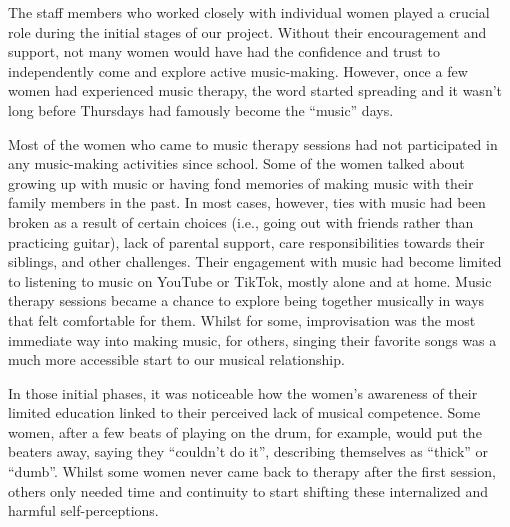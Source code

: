\documentclass[authordate, empirical]{jote-new-article}
\begin{document}
	The staff members who worked closely with individual women played a crucial role during the initial stages of our project. Without their encouragement and support, not many women would have had the confidence and trust to independently come and explore active music-making. However, once a few women had experienced music therapy, the word started spreading and it wasn't long before Thursdays had famously become the “music” days.







	Most of the women who came to music therapy sessions had not participated in any music-making activities since school. Some of the women talked about growing up with music or having fond memories of making music with their family members in the past. In most cases, however, ties with music had been broken as a result of certain choices (i.e., going out with friends rather than practicing guitar), lack of parental support, care responsibilities towards their siblings, and other challenges. Their engagement with music had become limited to listening to music on YouTube or TikTok, mostly alone and at home. Music therapy sessions became a chance to explore being together musically in ways that felt comfortable for them. Whilst for some, improvisation was the most immediate way into making music, for others, singing their favorite songs was a much more accessible start to our musical relationship.







	In those initial phases, it was noticeable how the women's awareness of their limited education linked to their perceived lack of musical competence. Some women, after a few beats of playing on the drum, for example, would put the beaters away, saying they “couldn't do it”, describing themselves as “thick” or “dumb”. Whilst some women never came back to therapy after the first session, others only needed time and continuity to start shifting these internalized and harmful self-perceptions.
\end{document}
